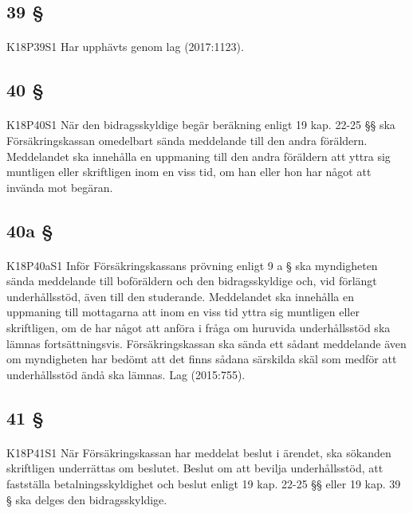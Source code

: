 \documentclass[a4paper,notitlepage,openany,10pt]{book}
\begin{document}
\subsection*{39 §}
\paragraph*{}
{\tiny K18P39S1}
Har upphävts genom
lag (2017:1123).
\subsection*{40 §}
\paragraph*{}
{\tiny K18P40S1}
När den bidragsskyldige begär beräkning enligt 19 kap. 22-25 §§ ska Försäkringskassan omedelbart sända meddelande till den andra föräldern. Meddelandet ska innehålla en uppmaning till den andra föräldern att yttra sig muntligen eller skriftligen inom en viss tid, om han eller hon har något att invända mot begäran.
\subsection*{40a §}
\paragraph*{}
{\tiny K18P40aS1}
Inför Försäkringskassans prövning enligt 9 a § ska myndigheten sända meddelande till boföräldern och den bidragsskyldige och, vid förlängt underhållsstöd, även till den studerande. Meddelandet ska innehålla en uppmaning till mottagarna att inom en viss tid yttra sig muntligen eller skriftligen, om de har något att anföra i fråga om huruvida underhållsstöd ska lämnas fortsättningsvis. Försäkringskassan ska sända ett sådant meddelande även om myndigheten har bedömt att det finns sådana särskilda skäl som medför att underhållsstöd ändå ska lämnas.
Lag (2015:755).
\subsection*{41 §}
\paragraph*{}
{\tiny K18P41S1}
När Försäkringskassan har meddelat beslut i ärendet, ska sökanden skriftligen underrättas om beslutet.
Beslut om att bevilja underhållsstöd, att fastställa betalningsskyldighet och beslut enligt 19 kap. 22-25 §§ eller 19 kap. 39 § ska delges den bidragsskyldige.
\end{document}
